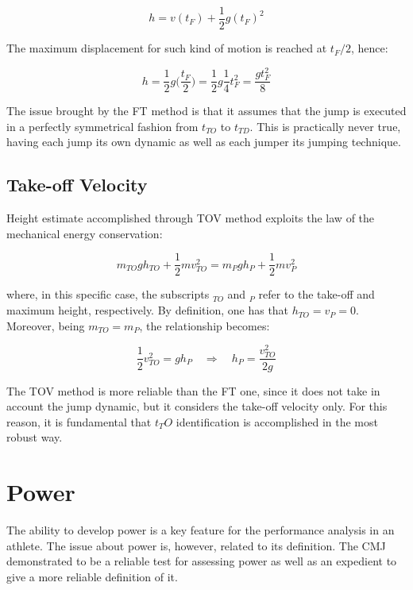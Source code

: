\begin{equation}\label{eq:uniform_acc_motion_bis}
	h = v(t_F) + \frac{1}{2} g(t_F)^2
\end{equation}

The maximum displacement for such kind of motion is reached at $t_F/2$, hence:

\begin{equation}\label{eq:flight_time}
	h = \frac{1}{2} g \bigg( \frac{t_F}{2} \bigg) = \frac{1}{2} g \frac{1}{4} t_F^2 = \frac{g t_F^2}{8}
\end{equation}

The issue brought by the FT method is that it assumes that the jump is executed in a perfectly symmetrical fashion from $t_{TO}$ to $t_{TD}$. This is practically never true, having each jump its own dynamic as well as each jumper its jumping technique. 

\subsection{Take-off Velocity}
Height estimate accomplished through TOV method exploits the law of the mechanical energy conservation:

\begin{equation}\label{eq:mechanical_energy_conservation}
	m_{TO} g h_{TO} + \frac{1}{2} m v_{TO}^2 = m_{P} g h_{P} + \frac{1}{2} m v_{P}^2 
\end{equation}

where, in this specific case, the subscripts $_{TO}$ and $_P$ refer to the take-off and maximum height, respectively. By definition, one has that $h_{TO} = v_P = 0$. Moreover, being $m_{TO} = m_P$, the relationship becomes:

\begin{equation}\label{eq:take-off_velocity}
	\frac{1}{2} v_{TO}^2 = gh_P \quad \Rightarrow \quad h_P = \frac{v_{TO}^2}{2g}
\end{equation}

The TOV method is more reliable than the FT one, since it does not take in account the jump dynamic, but it considers the take-off velocity only. For this reason, it is fundamental that $t_TO$ identification is accomplished in the most robust way. 

\section{Power}
The ability to develop power is a key feature for the performance analysis in an athlete. The issue about power is, however, related to its definition. The CMJ demonstrated to be a reliable test for assessing power as well as an expedient to give a more reliable definition of it. 

